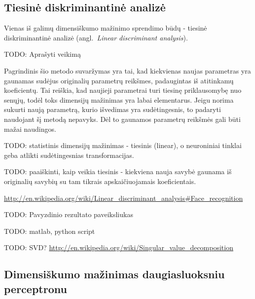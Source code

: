 \documentclass{VUMIFPSbakalaurinis}
\newcommand{\TODO}[1]{
\colorbox{todo-background-color}{TODO: #1}
}
\begin{document}
\subsection{Tiesinė diskriminantinė analizė}

Vienas iš galimų dimensiškumo mažinimo sprendimo būdų - tiesinė diskriminantinė analizė (angl.~\textit{Linear discriminant analysis}).

\TODO{Aprašyti veikimą}

Pagrindinis šio metodo suvaržymas yra tai, kad kiekvienas naujas parametras yra gaunamas sudėjus originalių parametrų reikšmes, padaugintas iš atitinkamų koeficientų.
Tai reiškia, kad naujieji parametrai turi tiesinę priklausomybę nuo senųjų, todėl toks dimensijų mažinimas yra labai elementarus.
Jeigu norima sukurti naują parametrą, kurio išvedimas yra sudėtingesnis, to padaryti naudojant šį metodą nepavyks.
Dėl to gaunamos parametrų reikšmės gali būti mažai naudingos.

\TODO{statistinis dimensijų mažinimas - tiesinis (linear), o neuroniniai tinklai geba atlikti sudėtingesnias transformacijas.}

\TODO{paaiškinti, kaip veikia tiesinis - kiekviena nauja savybė gaunama iš originalių savybių su tam tikrais apskaičiuojamais koeficientais.}


\url{http://en.wikipedia.org/wiki/Linear_discriminant_analysis#Face_recognition}

\TODO{Pavyzdinio rezultato paveiksliukas}

\TODO{matlab, python script}


\TODO{SVD? \url{http://en.wikipedia.org/wiki/Singular_value_decomposition}}


\subsection{Dimensiškumo mažinimas daugiasluoksniu perceptronu} \label{dimensionality-reduction-perceptron}
\end{document}
